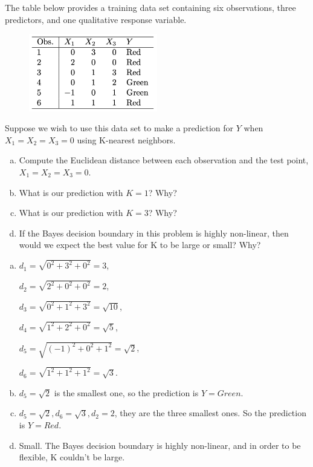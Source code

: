 \documentclass[14pt]{elegantbook}
\begin{document}
\begin{exercise*}[7]
    The table below provides a training data set containing six observations, three predictors, and one qualitative response variable.
    \begin{figure}[h]
        \centering
        \includegraphics[width=0.5\textwidth]{HW1.png}
    \end{figure}
    Suppose we wish to use this data set to make a prediction for $Y$ when $X_1 = X_2 = X_3 = 0$ using K-nearest neighbors. 
    \begin{enumerate}[(a)]
        \item Compute the Euclidean distance between each observation and the test point,$X_1 =X_2 =X_3 =0$. 
        \item What is our prediction with $K = 1$? Why?
        \item What is our prediction with $K = 3$? Why?
        \item If the Bayes decision boundary in this problem is highly non-linear, then would we expect the best value for K to be large or small? Why?
    \end{enumerate}
\end{exercise*}

\begin{solution}
    \begin{enumerate}[(a)]
        \item $d_1 = \sqrt{0^2 + 3^2 + 0^2} = 3$, 
        
        $d_2 = \sqrt{2^2 + 0^2 + 0^2} = 2$, 
        
        $d_3 = \sqrt{0^2 + 1^2 + 3^2} = \sqrt{10}$, 
        
        $d_4 = \sqrt{1^2 + 2^2 + 0^2} = \sqrt{5}$, 
        
        $d_5 = \sqrt{(-1)^2 + 0^2 + 1^2} = \sqrt{2}$, 
        
        $d_6 = \sqrt{1^2 + 1^2 + 1^2} = \sqrt{3}$.
        \item $d_5=\sqrt{2}$ is the smallest one, so the prediction is $Y = Green$. 
        \item $d_5=\sqrt{2}, d_6=\sqrt{3}, d_2=2$, they are the three smallest ones. So the prediction is $Y = Red$. 
        
        \item Small. The Bayes decision boundary is highly non-linear, and in order to be flexible, K couldn't be large. 
    \end{enumerate}
\end{solution}
\end{document}
